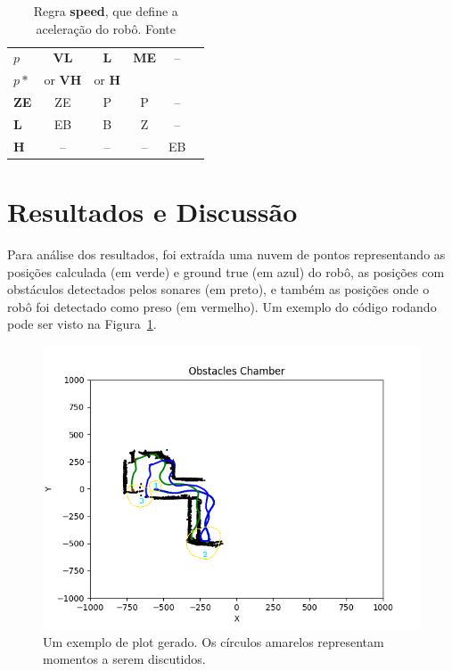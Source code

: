\documentclass[twoside,conference,a4paper]{IEEEtran}
\begin{document}
\begin{table}[ht]
  \renewcommand{\arraystretch}{1.3}
  \centering
   \caption{Regra \textbf{speed}, que define a aceleração do robô. Fonte \cite{Reinhard:1995}}
   \label{tab:tab1}
   \begin{tabular}{lccccc}\hline
      $p$   & \textbf{VL}    & \textbf{L}    & \textbf{ME} & -- \\
      $p*$  & or \textbf{VH} & or \textbf{H} &    &    \\ \hline
      \textbf{ZE}  & ZE    & P    & P  & -- \\ \hline
      \textbf{L}   & EB    & B    & Z  & -- \\ \hline
      \textbf{H}   & --    & --   & -- & EB \\ \hline
   \end{tabular}
\end{table}

\section{Resultados e Discussão}

Para análise dos resultados, foi extraída uma nuvem de pontos representando as posições calculada (em verde) e ground true (em azul) do robô, as posições com obstáculos detectados pelos sonares (em preto), e também as posições onde o robô foi detectado como preso (em vermelho). Um exemplo do código rodando pode ser visto na Figura~\ref{fig:plot1}.

\begin{figure}[ht]
\centering
\includegraphics[width=1\hsize]{figuras/figure_3.png}
\caption{Um exemplo de plot gerado. Os círculos amarelos representam momentos a serem discutidos.}
\label{fig:plot1}
\end{figure}
\end{document}
